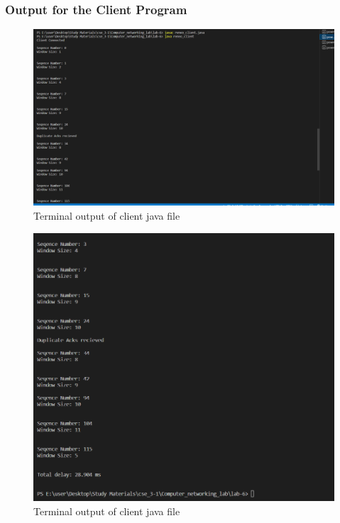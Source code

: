 \documentclass[11pt]{article}
\begin{document}
\subsubsection{Output for the Client Program}

  \begin{figure}[!h]
\centering
\includegraphics[width=\textwidth]{ren_client1.png}
\caption{Terminal output of client java file }
\end{figure}
\FloatBarrier

 \begin{figure}[!h]
\centering
\includegraphics[width=\textwidth]{ren_client2.png}
\caption{Terminal output of client java file }
\end{figure}
\FloatBarrier
\end{document}

